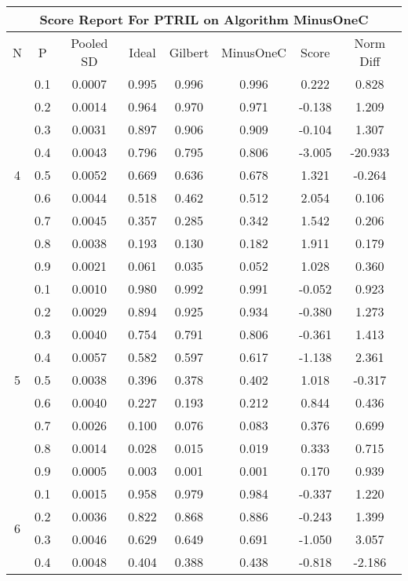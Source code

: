 \documentclass[11pt,a4paper]{report}
\begin{document}
\begin{longtable}{ | c | c || c | c | c | c | c | c | }
\hline
\multicolumn{8}{|c|}{ Score Report For PTRIL on Algorithm MinusOneC} \\
\hline
N & P & Pooled SD &  Ideal &  Gilbert & MinusOneC  & Score & Norm Diff \\
 \hline
 \hline
 \endhead
\multirow{9}{*}{4} & 0.1 & 0.0007 & 0.995 & 0.996 & 0.996 & 0.222 & 0.828 \\
 & 0.2 & 0.0014 & 0.964 & 0.970 & 0.971 & -0.138 & 1.209 \\
 & 0.3 & 0.0031 & 0.897 & 0.906 & 0.909 & -0.104 & 1.307 \\
 & 0.4 & 0.0043 & 0.796 & 0.795 & 0.806 & -3.005 & -20.933 \\
 & 0.5 & 0.0052 & 0.669 & 0.636 & 0.678 & 1.321 & -0.264 \\
 & 0.6 & 0.0044 & 0.518 & 0.462 & 0.512 & 2.054 & 0.106 \\
 & 0.7 & 0.0045 & 0.357 & 0.285 & 0.342 & 1.542 & 0.206 \\
 & 0.8 & 0.0038 & 0.193 & 0.130 & 0.182 & 1.911 & 0.179 \\
 & 0.9 & 0.0021 & 0.061 & 0.035 & 0.052 & 1.028 & 0.360 \\
 \hline
\multirow{9}{*}{5} & 0.1 & 0.0010 & 0.980 & 0.992 & 0.991 & -0.052 & 0.923 \\
 & 0.2 & 0.0029 & 0.894 & 0.925 & 0.934 & -0.380 & 1.273 \\
 & 0.3 & 0.0040 & 0.754 & 0.791 & 0.806 & -0.361 & 1.413 \\
 & 0.4 & 0.0057 & 0.582 & 0.597 & 0.617 & -1.138 & 2.361 \\
 & 0.5 & 0.0038 & 0.396 & 0.378 & 0.402 & 1.018 & -0.317 \\
 & 0.6 & 0.0040 & 0.227 & 0.193 & 0.212 & 0.844 & 0.436 \\
 & 0.7 & 0.0026 & 0.100 & 0.076 & 0.083 & 0.376 & 0.699 \\
 & 0.8 & 0.0014 & 0.028 & 0.015 & 0.019 & 0.333 & 0.715 \\
 & 0.9 & 0.0005 & 0.003 & 0.001 & 0.001 & 0.170 & 0.939 \\
 \hline
\multirow{9}{*}{6} & 0.1 & 0.0015 & 0.958 & 0.979 & 0.984 & -0.337 & 1.220 \\
 & 0.2 & 0.0036 & 0.822 & 0.868 & 0.886 & -0.243 & 1.399 \\
 & 0.3 & 0.0046 & 0.629 & 0.649 & 0.691 & -1.050 & 3.057 \\
 & 0.4 & 0.0048 & 0.404 & 0.388 & 0.438 & -0.818 & -2.186 \\

\end{longtable}
\end{document}
